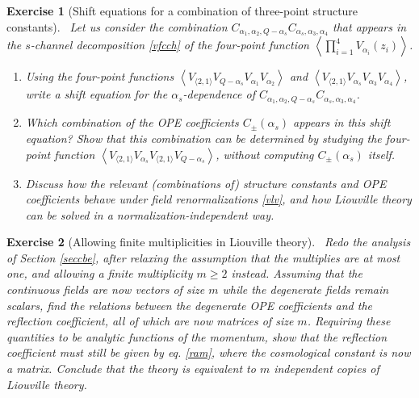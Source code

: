 \documentclass[12pt, a4paper, notitlepage, twoside]{report}
\numberwithin{equation}{section}
\theoremstyle{break}
\newtheorem{exo}{Exercise}[chapter]
\begin{document}
\begin{exo}[Shift equations for a combination of three-point structure constants]
 ~\label{exocas}
 Let us consider the combination $C_{\alpha_1,\alpha_2,Q-\alpha_s}C_{\alpha_s,\alpha_3,\alpha_4}$
 that appears in the $s$-channel decomposition \eqref{vfcch} of the four-point function $\left<\prod_{i=1}^4 V_{\alpha_i}(z_i)\right>$.
 \begin{enumerate}
  \item Using the four-point functions $\left<V_{\langle 2, 1\rangle} V_{Q-\alpha_s} V_{\alpha_1}V_{\alpha_2}\right>$ and $\left<V_{\langle 2, 1\rangle} V_{\alpha_s} V_{\alpha_3}V_{\alpha_4}\right>$, write a shift equation for the $\alpha_s$-dependence of $C_{\alpha_1,\alpha_2,Q-\alpha_s}C_{\alpha_s,\alpha_3,\alpha_4}$.
  \item Which combination of the OPE coefficients $C_\pm(\alpha_s)$ appears in this shift equation? Show that this combination can be determined by studying the four-point function $\left<V_{\langle 2, 1\rangle} V_{\alpha_s} V_{\langle 2, 1\rangle} V_{Q-\alpha_s}\right>$, without computing $C_\pm(\alpha_s)$ itself.
  \item Discuss how the relevant (combinations of) structure constants and OPE coefficients behave under field renormalizations \eqref{vlv}, and how Liouville theory can be solved in a normalization-independent way. 
 \end{enumerate}
\end{exo}


\begin{exo}[Allowing finite multiplicities in Liouville theory]
 ~\label{exomul}
Redo the analysis of Section \ref{seccbe}, after relaxing the assumption that the multiplies are at most one, and allowing a finite multiplicity $m\geq 2$ instead. 
Assuming that the continuous fields are now vectors of size $m$ while the degenerate fields remain scalars, find the relations between the degenerate OPE coefficients and the reflection coefficient, all of which are now matrices of size $m$. 
Requiring these quantities to be analytic functions of the momentum, show that the reflection coefficient must still be given by eq. \eqref{ram}, where the cosmological constant is now a matrix. 
Conclude that the theory is equivalent to $m$ independent copies of Liouville theory. 
\end{exo}
\end{document}
